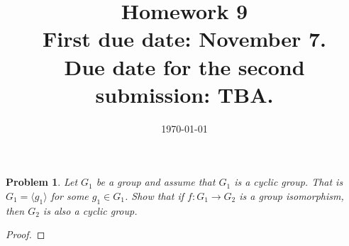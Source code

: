 \documentclass[reqno]{amsart}
\theoremstyle{plain}
\newtheorem{problem}{Problem}
\theoremstyle{definition}
\begin{document}
 

\title[Homework 9]{Homework 9 \\ First due date: November 7.  \\  Due date for the second submission:  TBA.}

\date{\today} 
\maketitle 


\begin{problem}
Let $G_{1}$ be a group and assume that $G_{1}$ is a cyclic group.  That is $G_{1} = \langle g_{1} \rangle$ for some $g_{1} \in G_{1}$.  Show that if $f:G_{1} \longrightarrow G_{2}$ is a group isomorphism, then $G_{2}$ is also a cyclic group.  
\end{problem}
\begin{proof}

\end{proof}
\end{document}
